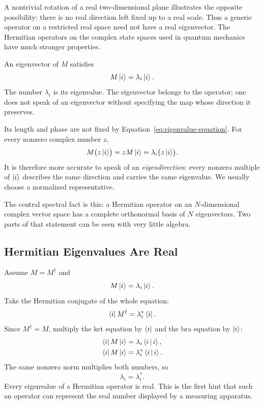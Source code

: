 A nontrivial rotation of a real two-dimensional plane illustrates the opposite possibility: there is no real direction left fixed up to a real scale. Thus a generic operator on a restricted real space need not have a real eigenvector. The Hermitian operators on the complex state spaces used in quantum mechanics have much stronger properties.

An eigenvector of \(M\) satisfies
\begin{equation}
M\left\lvert i\right\rangle=\lambda_i\left\lvert i\right\rangle.
\label{eq:eigenvalue-equation}
\end{equation}
The number \(\lambda_i\) is its eigenvalue. The eigenvector belongs to the operator; one does not speak of an eigenvector without specifying the map whose direction it preserves.

Its length and phase are not fixed by Equation~\eqref{eq:eigenvalue-equation}. For every nonzero complex number \(z\),
\[
M\bigl(z\left\lvert i\right\rangle\bigr)
=zM\left\lvert i\right\rangle
=\lambda_i\bigl(z\left\lvert i\right\rangle\bigr).
\]
It is therefore more accurate to speak of an \emph{eigendirection}: every nonzero multiple of \(\left\lvert i\right\rangle\) describes the same direction and carries the same eigenvalue. We usually choose a normalized representative.

The central spectral fact is this: a Hermitian operator on an \(N\)-dimensional complex vector space has a complete orthonormal basis of \(N\) eigenvectors. Two parts of that statement can be seen with very little algebra.

\subsection{Hermitian Eigenvalues Are Real}

Assume \(M=M^\dagger\) and
\[
M\left\lvert i\right\rangle=\lambda_i\left\lvert i\right\rangle.
\]
Take the Hermitian conjugate of the whole equation:
\begin{equation}
\left\langle i\right\rvert M^\dagger=\lambda_i^*\left\langle i\right\rvert.
\label{eq:eigen-bra-equation}
\end{equation}
Since \(M^\dagger=M\), multiply the ket equation by \(\left\langle i\right\rvert\) and the bra equation by \(\left\lvert i\right\rangle\):
\begin{align}
\left\langle i\right\rvert M\left\lvert i\right\rangle&=\lambda_i\left\langle i\,\middle|\,i\right\rangle,\\
\left\langle i\right\rvert M\left\lvert i\right\rangle&=\lambda_i^*\left\langle i\,\middle|\,i\right\rangle.
\end{align}
The same nonzero norm multiplies both numbers, so
\begin{equation}
\lambda_i=\lambda_i^*.
\end{equation}
Every eigenvalue of a Hermitian operator is real. This is the first hint that such an operator can represent the real number displayed by a measuring apparatus.

